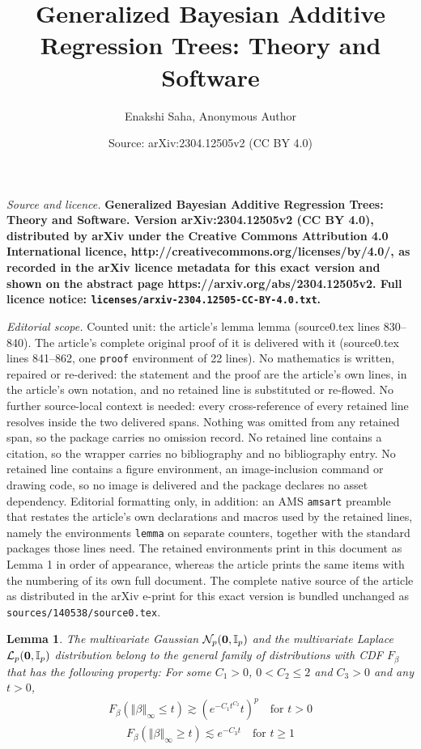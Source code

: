\documentclass[10pt,a4paper]{amsart}
\title{\bf Generalized Bayesian Additive Regression Trees: Theory and Software}
\author{Enakshi Saha, Anonymous Author}
\date{Source: arXiv:2304.12505v2 (CC BY 4.0)}
\newtheorem{lemma}{Lemma}
\newcommand{\norm}[1]{\left\Vert#1\right\Vert}
\begin{document}
\maketitle

\noindent\emph{Source and licence.} \bf Generalized Bayesian Additive Regression Trees: Theory and Software. Version arXiv:2304.12505v2 (CC BY 4.0), distributed by arXiv under the Creative Commons Attribution 4.0 International licence, http://creativecommons.org/licenses/by/4.0/, as recorded in the arXiv licence metadata for this exact version and shown on the abstract page https://arxiv.org/abs/2304.12505v2. Full licence notice: \texttt{licenses/arxiv-2304.12505-CC-BY-4.0.txt}.\par\smallskip

\noindent\textit{Editorial scope.} Counted unit: the article's lemma lemma (source0.tex lines 830--840). The article's complete original proof of it is delivered with it (source0.tex lines 841--862, one \texttt{proof} environment of 22 lines). No mathematics is written, repaired or re-derived: the statement and the proof are the article's own lines, in the article's own notation, and no retained line is substituted or re-flowed.  No further source-local context is needed: every cross-reference of every retained line resolves inside the two delivered spans.  Nothing was omitted from any retained span, so the package carries no omission record.  No retained line contains a citation, so the wrapper carries no bibliography and no bibliography entry.  No retained line contains a figure environment, an image-inclusion command or drawing code, so no image is delivered and the package declares no asset dependency.  Editorial formatting only, in addition: an AMS \texttt{amsart} preamble that restates the article's own declarations and macros used by the retained lines, namely the environments \texttt{lemma} on separate counters, together with the standard packages those lines need.  The retained environments print in this document as Lemma 1 in order of appearance, whereas the article prints the same items with the numbering of its own full document.  The complete native source of the article as distributed in the arXiv e-print for this exact version is bundled unchanged as \texttt{sources/140538/source0.tex}.
\begin{lemma}
The multivariate Gaussian $\mathcal{N}_p ({\bf 0}, \mathbb{I}_p)$ and the multivariate Laplace $\mathcal{L}_p ({\bf 0}, \mathbb{I}_p)$ distribution belong to the general family of distributions with CDF $F_\beta$ that has the following property:
For some $C_1>0$, $0 < C_2 \le 2$ and $C_3 > 0$ and any $t>0$,
    \begin{align}
        F_\beta(\norm{\beta}_\infty \le t) \gtrsim \left (e^{-C_1 t^{C_2}} t \right)^{p} \quad \text{for $t>0$}
    \end{align}
    \vspace{-10pt}
    \begin{align}
        F_\beta(\norm{\beta}_\infty \ge t) \lesssim e^{-C_3 t} \quad \text{for $t \ge 1$}
    \end{align}
\end{lemma}
\end{document}
